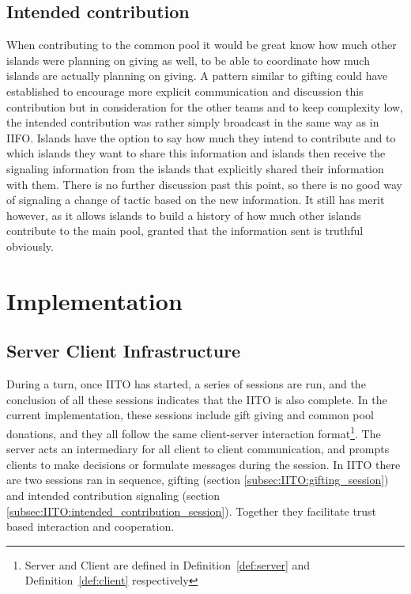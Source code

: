\subsection{Intended contribution}
\label{subsec:IITO:intended_contribution}
When contributing to the common pool it would be great know how much other islands were planning on giving as well, to be able to coordinate how much islands are actually planning on giving. A pattern similar to gifting could have established to encourage more explicit communication and discussion this contribution but in consideration for the other teams and to keep complexity low, the intended contribution was rather simply broadcast in the same way as in IIFO. Islands have the option to say how much they intend to contribute and to which islands they want to share this information and islands then receive the signaling information from the islands that explicitly shared their information with them. There is no further discussion past this point, so there is no good way of signaling a change of tactic based on the new information. It still has merit however, as it allows islands to build a history of how much other islands contribute to the main pool, granted that the information sent is truthful obviously.
\section{Implementation}
\label{sec:IITO:Implementation}

\subsection{Server Client Infrastructure}
\label{subsec:IITO:server_client_infrastructure}  

During a turn, once IITO has started, a series of sessions are run, and the conclusion of all these sessions indicates that the IITO is also complete. In the current implementation, these sessions include gift giving and common pool donations, and they all follow the same client-server interaction format\footnote{Server and Client are defined in Definition~\ref{def:server} and Definition~\ref{def:client} respectively}. The server acts an intermediary for all client to client communication, and prompts clients to make decisions or formulate messages during the session. In IITO there are two sessions ran in sequence, gifting (section \ref{subsec:IITO:gifting_session}) and intended contribution signaling (section \ref{subsec:IITO:intended_contribution_session}). Together they facilitate trust based interaction and cooperation. 

